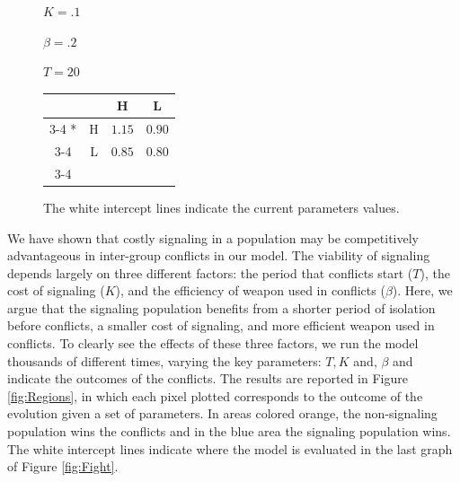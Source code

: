 \begin{figure}[p]
\begin{minipage}[c]{.2\textwidth}
    $K = .1$
    
    $\beta = .2$
    
    $T = 20$
    \end{minipage}\hfill
  \begin{minipage}[c]{.3\textwidth}
  \begin{tabular}{cc|c|c|}
      & \multicolumn{1}{c}{} & \multicolumn{1}{c}{H}  & \multicolumn{1}{c}{L} \\\cline{3-4}
      \multirow{2}*{}  & H & $1.15$ & $0.90$ \\\cline{3-4}
      & L & $0.85$ & $0.80$ \\\cline{3-4}
    \end{tabular}
    \end{minipage}\hfill
    \begin{minipage}[c]{.3\textwidth}
    The white intercept lines indicate the current parameters values. 
    \end{minipage}
    \end{figure}
    
We have shown that costly signaling in a population may be competitively advantageous in inter-group conflicts in our model. The viability of signaling depends largely on three different factors: the period that conflicts start ($T$), the cost of signaling ($K$), and the efficiency of weapon used in conflicts ($\beta$). Here, we argue that the signaling population benefits from a shorter period of isolation before conflicts, a smaller cost of signaling, and more efficient weapon used in conflicts. To clearly see the effects of these three factors, we run the model thousands of different times, varying the key parameters: $T,K$ and, $\beta$ and indicate the outcomes of the conflicts. The results are reported in Figure \ref{fig:Regions}, in which each pixel plotted corresponds to the outcome of the evolution given a set of parameters. In areas colored orange, the non-signaling population wins the conflicts and in the blue area the signaling population wins. The white intercept lines indicate where the model is evaluated in the last graph of Figure \ref{fig:Fight}.

